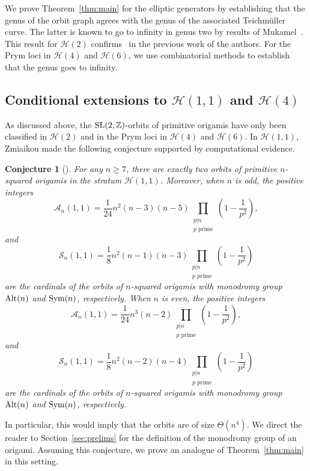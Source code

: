 \documentclass[a4paper,11pt]{amsart}
\numberwithin{equation}{section}
\numberwithin{figure}{section}
\numberwithin{table}{section}
\newtheorem{conjecture}[theorem]{Conjecture}
\newcommand{\teichmuller}{Teichm{\"u}ller }
\newcommand{\calH}{\mathcal{H}}
\newcommand{\Z}{\mathbb{Z}}
\DeclareMathOperator{\SL}{{\rm{SL}}}
\DeclareMathOperator{\Sym}{{\rm{Sym}}}
\DeclareMathOperator{\Alt}{{\rm{Alt}}}
\begin{document}
We prove Theorem~\ref{thm:main} for the elliptic generators by establishing that the genus of the orbit graph agrees with the genus of the associated \teichmuller curve. The latter is known to go to infinity in genus two by results of Mukamel~\cite{Muk}. This result for $\calH(2)$ confirms~\cite[Conjecture 1.2]{JM} in the previous work of the authors. For the Prym loci in $\calH(4)$ and $\calH(6)$, we use combinatorial methods to establish that the genus goes to infinity.


\subsection{Conditional extensions to $\calH(1,1)$ and $\calH(4)$}

As discussed above, the $\SL(2,\Z)$-orbits of primitive origamis have only been classified in $\calH(2)$ and in the Prym loci in $\calH(4)$ and $\calH(6)$. In $\calH(1,1)$, Zmiaikou made the following conjecture supported by computational evidence. 

\begin{conjecture}[{\cite[Conjecture 1]{Zm}}]\label{conj:zmiaikou}
    For any $n\geq7$, there are exactly two orbits of primitive $n$-squared origamis in the stratum $\calH(1,1)$. Moreover, when $n$ is odd, the positive integers
    $$\mathcal{A}_n(1,1) = \frac{1}{24}n^2(n-3)(n-5)\prod_{\substack{p|n\\p\text{ prime}}}\left(1-\frac{1}{p^2}\right),$$
    and
    $$\mathcal{S}_n(1,1) = \frac{1}{8}n^2(n-1)(n-3)\prod_{\substack{p|n\\p\text{ prime}}}\left(1-\frac{1}{p^2}\right)$$
    are the cardinals of the orbits of $n$-squared origamis with monodromy group $\Alt(n)$ and $\Sym(n)$, respectively.
    When $n$ is even, the positive integers
    $$\mathcal{A}_n(1,1) = \frac{1}{24}n^3(n-2)\prod_{\substack{p|n\\p\text{ prime}}}\left(1-\frac{1}{p^2}\right),$$
    and
    $$\mathcal{S}_n(1,1) = \frac{1}{8}n^2(n-2)(n-4)\prod_{\substack{p|n\\p\text{ prime}}}\left(1-\frac{1}{p^2}\right)$$
    are the cardinals of the orbits of $n$-squared origamis with monodromy group $\Alt(n)$ and $\Sym(n)$, respectively.
\end{conjecture}

In particular, this would imply that the orbits are of size $\Theta(n^4)$. We direct the reader to Section~\ref{sec:prelims} for the definition of the monodromy group of an origami. Assuming this conjecture, we prove an analogue of Theorem~\ref{thm:main} in this setting.
\end{document}
